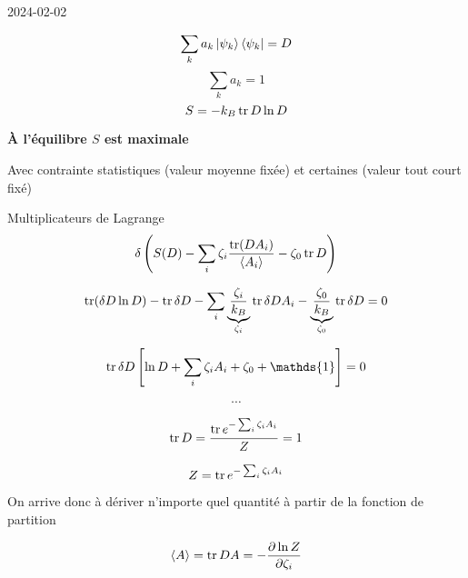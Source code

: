 


2024-02-02

\begin{tcolorbox}[title=Rappels]
\[ \sum_k a_k \ket{\psi_{k}}\bra{\psi_{k}} = D  \] 
\[ \sum_k a_k =1 \]
\[ S = - k_{B} \tr D \ln D \]

\textbf{À l'équilibre $S$ est maximale}
\end{tcolorbox}


Avec contrainte statistiques (valeur moyenne fixée) et certaines (valeur tout court fixé) 

Multiplicateurs de Lagrange 
\[ \delta \left( S(D) - \sum_i \zeta_i \frac{\tr(DA_i)}{\expval{A_i }} - \zeta_0 \tr D\right)   \]

\[ \tr(\delta{D} \ln D) - \tr \delta D - \sum_i \underbrace{\frac{\zeta_{i}}{k_{B}}}_{\zeta_i} \tr \delta D A_i - \underbrace{\frac{\zeta_{0}}{k_{B}}}_{\zeta_0}\tr \delta D =0     \]

\[ \tr \delta D  \left[ \ln D + \sum_i \zeta_i A_i + \zeta_0 + \mathds{1} \right] = 0  \]


\[ \dotsb \]

\[ \tr D = \frac{\tr e^{-\sum_i \zeta_i A_{i}}}{Z} = 1  \]

\[ Z = \tr e^{-\sum_i \zeta_i A_{i}}\]


On arrive donc à dériver n'importe quel quantité à partir de la fonction de partition

\[ \expval{A} = \tr DA = - \pdv{\ln{Z}}{\zeta_i}  \]





